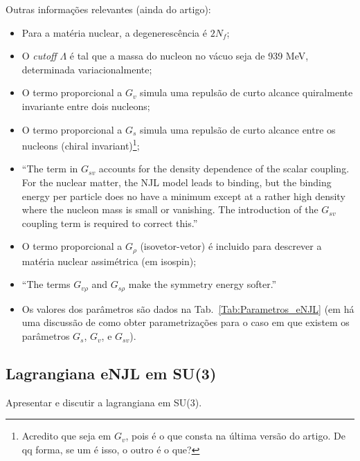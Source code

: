 Outras informações relevantes (ainda do artigo):
\begin{itemize}
	\item Para a matéria nuclear, a degenerescência é $2 N_f$;
	\item O \emph{cutoff} $\Lambda$ é tal que a massa do nucleon no vácuo seja de 939 MeV, determinada variacionalmente;
	\item O termo proporcional a $G_v$ simula uma repulsão de curto alcance quiralmente invariante entre dois nucleons;
	\item O termo proporcional a $G_s$ simula uma repulsão de curto alcance entre os nucleons (chiral invariant)\footnote{Acredito que seja em $G_v$, pois é o que consta na última versão do artigo. De qq forma, se um é isso, o outro é o que?};
	\item ``The term in $G_{sv}$ accounts for the density dependence of the scalar coupling. For the nuclear matter, the NJL model leads to binding, but the binding energy per particle does no have a minimum except at a rather high density where the nucleon mass is small or vanishing. The introduction of the $G_{sv}$ coupling term is required to correct this.''
	\item O termo proporcional a $G_\rho$ (isovetor-vetor) é incluido para descrever a matéria nuclear assimétrica (em isospin);
	\item ``The terms $G_{v\rho}$ and $G_{s\rho}$ make the symmetry energy softer.''
	\item Os valores dos parâmetros são dados na Tab.~\ref{Tab:Parametros_eNJL} (em \textcite{japoneses} há uma discussão de como obter parametrizações para o caso em que existem os parâmetros $G_s$, $G_v$, e $G_{sv}$).
\end{itemize}

\subsection{Lagrangiana eNJL em SU(3)}

Apresentar e discutir a lagrangiana em SU(3).


